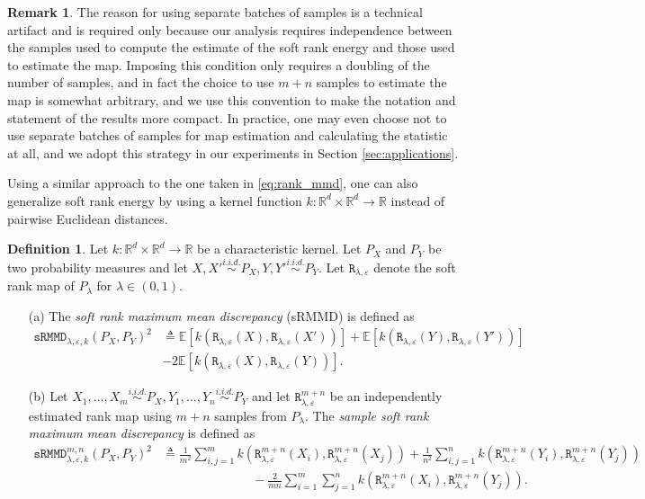 \documentclass{article}
\theoremstyle{definition}
\newtheorem{definition}{Definition}
\newcommand{\sR}{\mathtt{R}_{\lambda,\varepsilon}}
\newcommand{\sRn}{\mathtt{R}_{\lambda,\varepsilon}^{m+n}}
\newcommand{\sRMMD}{\mathtt{sRMMD}_{\lambda,\varepsilon, k}}
\newcommand{\sRMMDn}{\mathtt{sRMMD}_{\lambda,\varepsilon, k}^{m,n}}
\newtheorem*{remark}{Remark}
\begin{document}
\begin{remark} The reason for using separate batches of samples is a technical artifact and is required only because our analysis requires independence between the samples used to compute the estimate of the soft rank energy and those used to estimate the map. Imposing this condition only requires a doubling of the number of samples, and in fact the choice to use $m+n$ samples to estimate the map is somewhat arbitrary, and we use this convention to make the notation and statement of the results more compact. In practice, one may even choose not to use separate batches of samples for map estimation and calculating the statistic at all, and we adopt this strategy in our experiments in Section \ref{sec:applications}.
\end{remark}

Using a similar approach to the one taken in \eqref{eq:rank_mmd}, one can also generalize soft rank energy by using a kernel function $k:\mathbb R^d\times \mathbb R^d\rightarrow \mathbb R$ instead of pairwise Euclidean distances. 

\begin{definition}
    Let $k:\mathbb{R}^d \times \mathbb{R}^d \rightarrow \mathbb{R}$ be a characteristic kernel. Let $P_X$ and $P_Y$ be two probability measures and let $X,X' \overset{i.i.d.}{\sim} P_X, Y,Y' \overset{i.i.d.}{\sim} P_Y$.  Let $\sR$ denote the soft rank map of $P_\lambda$ for $\lambda \in (0,1)$. 
    
    \begin{enumerate}
    \item[(a)] The \textit{soft rank maximum mean discrepancy} (sRMMD) is defined as 
    \begin{align*}
        \sRMMD(P_X,P_Y)^2 &\triangleq  \mathbb{E} [k(\sR(X),\sR(X'))] + \mathbb{E} [k(\sR(Y),\sR(Y'))] \nonumber \\
        & - 2\mathbb{E}[k(\sR(X),\sR(Y))].
    \end{align*}
    \item[(b)] Let $X_1,...,X_m \overset{i.i.d.}{\sim} P_X, Y_1,...,Y_n \overset{i.i.d.}{\sim} P_Y$ and let $\sRn$ be an independently estimated rank map using $m+n$ samples from $P_\lambda$. The \emph{sample soft rank maximum mean discrepancy} is defined as
    \begin{align*} 
        \sRMMDn(P_X,P_Y)^2 &\triangleq  \frac{1}{m^2} \sum_{i,j=1}^m k(\sRn(X_i),\sRn(X_j)) + \frac{1}{n^2} \sum_{i,j=1}^n k(\sRn(Y_i),\sRn(Y_j)) \nonumber \\
        & \hspace{3cm} - \frac{2}{mn} \sum_{i=1}^m\sum_{j=1}^n k(\sRn(X_i),\sRn(Y_j)). %
    \end{align*}
    \end{enumerate}
\end{definition}
\end{document}

